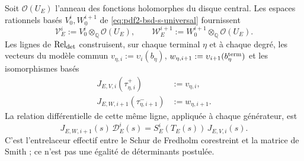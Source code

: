 Soit $\mathcal O(U_E)$ l'anneau des fonctions holomorphes du disque central.
Les espaces rationnels basés $V_0^i,W_0^{i+1}$ de
\eqref{eq:pdf2-bsd-s-universal} fournissent
\begin{equation}\label{eq:pdf2-bsd-dominios-analiticos}
 \mathscr V_E^i:=V_0^i\otimes_{\mathbb Q}\mathcal O(U_E),
 \qquad
 \mathscr W_E^{i+1}:=W_0^{i+1}\otimes_{\mathbb Q}\mathcal O(U_E).
\end{equation}
Les lignes de $\operatorname{Rel}_{\rm det}$ construisent, sur chaque terminal
$\eta$ et à chaque degré, les vecteurs du modèle commun
$v_{\eta,i}:=\upsilon_i(b_\eta)$,
$w_{\eta,i+1}:=\upsilon_{i+1}(b_\eta^{\rm term})$ et les isomorphismes basés
\begin{equation}\label{eq:pdf2-bsd-jvw-generadores}
 \begin{aligned}
  J_{E,V,i}(\tau_{\eta,i}^+)&:=v_{\eta,i},\\
  J_{E,W,i+1}(\tau_{\eta,i+1}^-)&:=w_{\eta,i+1}.
 \end{aligned}
\end{equation}
La relation différentielle de cette même ligne, appliquée à chaque générateur, est
\begin{equation}\label{eq:pdf2-bsd-entrelazamiento-analitico-smith}
 \boxed{
 J_{E,W,i+1}(s)\,\mathscr D_E^i(s)
 =S_E^i(T_E(s))\,J_{E,V,i}(s).}
\end{equation}
C'est l'entrelaceur effectif entre le Schur de Fredholm corestreint et la
matrice de Smith ; ce n'est pas une égalité de déterminants postulée.

